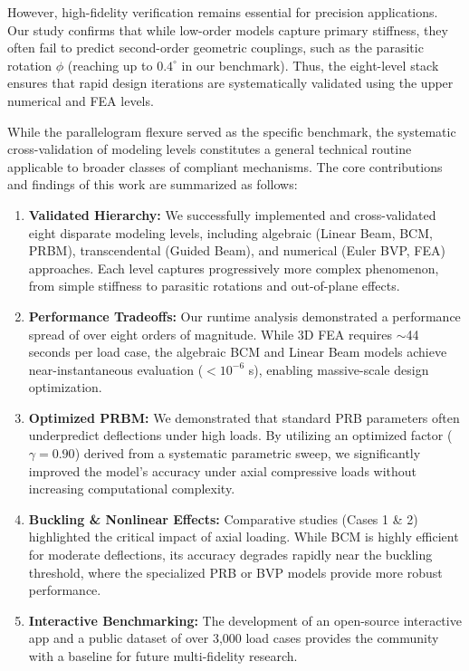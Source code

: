 \documentclass[colorlinks,upint,subscriptcorrection,varvw,hyphenate,balance]{asmeconf} %
\begin{document}
However, high-fidelity verification remains essential for precision applications. Our study confirms that while low-order models capture primary stiffness, they often fail to predict second-order geometric couplings, such as the parasitic rotation $\phi$ (reaching up to $0.4^\circ$ in our benchmark). Thus, the eight-level stack ensures that rapid design iterations are systematically validated using the upper numerical and FEA levels.

While the parallelogram flexure served as the specific benchmark, the systematic cross-validation of modeling levels constitutes a general technical routine applicable to broader classes of compliant mechanisms. The core contributions and findings of this work are summarized as follows:
\begin{enumerate}
    \item \textbf{Validated Hierarchy:} We successfully implemented and cross-validated eight disparate modeling levels, including algebraic (Linear Beam, BCM, PRBM), transcendental (Guided Beam), and numerical (Euler BVP, FEA) approaches. Each level captures progressively more complex phenomenon, from simple stiffness to parasitic rotations and out-of-plane effects.
    \item \textbf{Performance Tradeoffs:} Our runtime analysis demonstrated a performance spread of over eight orders of magnitude. While 3D FEA requires $\sim$44 seconds per load case, the algebraic BCM and Linear Beam models achieve near-instantaneous evaluation ($<10^{-6}$ s), enabling massive-scale design optimization.
    \item \textbf{Optimized PRBM:} We demonstrated that standard PRB parameters often underpredict deflections under high loads. By utilizing an optimized factor ($\gamma = 0.90$) derived from a systematic parametric sweep, we significantly improved the model's accuracy under axial compressive loads without increasing computational complexity.
    \item \textbf{Buckling \& Nonlinear Effects:} Comparative studies (Cases 1 \& 2) highlighted the critical impact of axial loading. While BCM is highly efficient for moderate deflections, its accuracy degrades rapidly near the buckling threshold, where the specialized PRB or BVP models provide more robust performance.
    \item \textbf{Interactive Benchmarking:} The development of an open-source interactive app and a public dataset of over 3,000 load cases \cite{GitHubRepo} provides the community with a baseline for future multi-fidelity research.
\end{enumerate}
\end{document}
